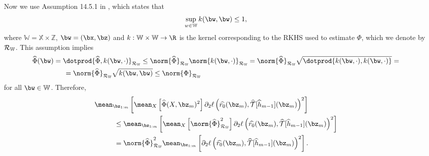 Now we use Assumption 14.5.1 in \cite{sugiyama2012}, which states that
\begin{equation*}
    \sup_{ w \in \mathbb{W} } k ( \bw, \bw ) \leq 1
,\end{equation*}
where $ \mathbb{W} = \mathbb{X} \times \mathbb{Z} $, $ \bw = ( \bx, \bz ) $ and $ k : \mathbb{W} \times \mathbb{W} \to \R $ is the kernel corresponding to the RKHS used to estimate $ \Phi $, which we denote by $ \mathcal{R}_{ \mathbb{W} } $.
This assumption implies
\begin{align*}
    &\hat{ \Phi } ( \bw )
    = \dotprod{ \hat{ \Phi }, k ( \bw, \cdot ) }_{ \rkhsw }
    \leq \norm{ \hat{ \Phi } }_{ \rkhsw } \norm{ k ( \bw, \cdot ) }_{ \rkhsw }
    = \norm{ \hat{ \Phi } }_{ \rkhsw } \sqrt{ \dotprod{ k ( \bw, \cdot ), k ( \bw, \cdot ) } } = \\
    &\hspace{1.6cm}
    = \norm{ \hat{ \Phi } }_{ \rkhsw } \sqrt{ k ( \bw, \bw ) }
    \leq \norm{ \Phi }_{ \rkhsw }
\end{align*}
for all $ \bw \in \mathbb{W} $.
Therefore,
\begin{align*}
    &\mean_{ \bz_{ 1:m } } \left[
        \mean_{ X } \left[
            \hat{ \Phi } ( X, \bz_{ m } )^2
        \right]
        \partial_{ 2 } \ell \left(
            \hat{ r_{ 0 } } ( \bz_{ m } ),
            \hat{ \mathcal{T} } [ \hat{ h }_{ m-1 } ] ( \bz_{ m } )
        \right)^2
    \right] \\
    &\hspace{1cm}\leq
    \mean_{ \bz_{ 1:m } } \left[
        \mean_{ X } \left[
            \norm{ \hat{ \Phi } }_{ \rkhsw }^2
        \right]
        \partial_{ 2 } \ell \left(
            \hat{ r_{ 0 } } ( \bz_{ m } ),
            \hat{ \mathcal{T} } [ \hat{ h }_{ m-1 } ] ( \bz_{ m } )
        \right)^2
    \right] \\
    &\hspace{1cm}=
    \norm{ \hat{ \Phi } }_{ \rkhsw }^2
    \mean_{ \bz_{ 1:m } } \left[
        \partial_{ 2 } \ell \left(
            \hat{ r_{ 0 } } ( \bz_{ m } ),
            \hat{ \mathcal{T} } [ \hat{ h }_{ m-1 } ] ( \bz_{ m } )
        \right)^2
    \right]
.\end{align*}

